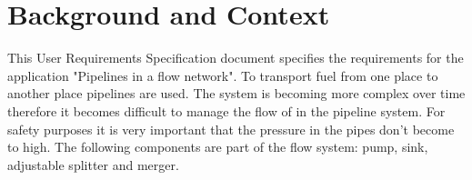 \documentclass[12pt]{report}
\begin{document}

\restoregeometry 
\nopagecolor

\begingroup
\let\cleardoublepage\relax
\let\clearpage\relax
\section*{Background and Context}
This User Requirements Specification document specifies the requirements for the application "Pipelines in a flow network". To transport fuel from one place to another place pipelines are used. The  system is becoming more complex over time therefore it becomes difficult to manage the flow of in the pipeline system. For safety purposes it is very important that the pressure in the pipes don't become to high. The following components are part of the flow system: pump, sink, adjustable splitter and merger.

\tableofcontents
\endgroup





\end{document}
